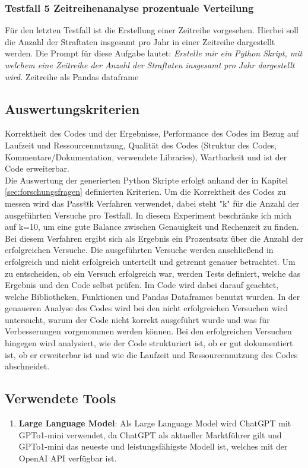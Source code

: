 \documentclass[11pt,a4paper]{article}
\begin{document}
\subsubsection{Testfall 5 Zeitreihenanalyse prozentuale Verteilung}
    Für den letzten Testfall ist die Erstellung einer Zeitreihe vorgesehen. Hierbei soll die Anzahl der Straftaten insgesamt pro Jahr in einer Zeitreihe dargestellt werden. Die Prompt für diese Aufgabe lautet: \emph{Erstelle mir ein Python Skript, mit welchem eine Zeitreihe der Anzahl der Straftaten insgesamt pro Jahr dargestellt wird.}
    Zeitreihe als Pandas dataframe


\subsection{Auswertungskriterien}
\label{sec:auswertungskriterien}
    Korrektheit des Codes und der Ergebnisse, Performance des Codes im Bezug auf Laufzeit und Ressourcennutzung, Qualität des Codes (Struktur des Codes, Kommentare/Dokumentation, verwendete Libraries), Wartbarkeit und ist der Code erweiterbar.\\

    Die Auswertung der generierten Python Skripte erfolgt anhand der in Kapitel \ref{sec:forschungsfragen} definierten Kriterien. Um die Korrektheit des Codes zu messen wird das Pass@k Verfahren verwendet, dabei steht "k" für die Anzahl der ausgeführten Versuche pro Testfall. In diesem Experiment beschränke ich mich auf k=10, um eine gute Balance zwischen Genauigkeit und Rechenzeit zu finden. Bei diesem Verfahren ergibt sich als Ergebnis ein Prozentsatz über die Anzahl der erfolgreichen Versuche. Die ausgeführten Versuche werden anschließend in erfolgreich und nicht erfolgreich unterteilt und getrennt genauer betrachtet. Um zu entscheiden, ob ein Versuch erfolgreich war, werden Tests definiert, welche das Ergebnis und den Code selbst prüfen. Im Code wird dabei darauf geachtet, welche Bibliotheken, Funktionen und Pandas Dataframes benutzt wurden.
    In der genaueren Analyse des Codes wird bei den nicht erfolgreichen Versuchen wird untersucht, warum der Code nicht korrekt ausgeführt wurde und was für Verbesserungen vorgenommen werden können. Bei den erfolgreichen Versuchen hingegen wird analysiert, wie der Code strukturiert ist, ob er gut dokumentiert ist, ob er erweiterbar ist und wie die Laufzeit und Ressourcennutzung des Codes abschneidet.

\subsection{Verwendete Tools}
    \begin{enumerate}
        \item \textbf{Large Language Model}: Als Large Language Model wird ChatGPT mit GPTo1-mini verwendet, da ChatGPT als aktueller Marktführer gilt und GPTo1-mini das neueste und leistungsfähigste Modell ist, welches mit der OpenAI API verfügbar ist.
        
    \end{enumerate}
\end{document}
